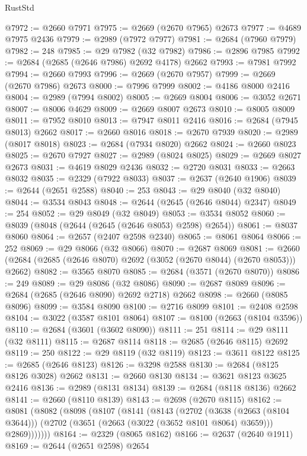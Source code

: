 \begin{lexlean}{RustStd}
\begin{coremodule}
@7972 := @2660 @7971
@7975 := @2669 (@2670 @7965) @2673
@7977 := @4689 @7975 @2436
@7979 := @2989 (@7972 @7977)
@7981 := @2684 (@7960 @7979)
@7982 := 248
@7985 := @29 @7982 (@32 @7982)
@7986 := @2896 @7985
@7992 := @2684 (@2685 (@2646 @7986) @2692 @4178) @2662
@7993 := @7981 @7992
@7994 := @2660 @7993
@7996 := @2669 (@2670 @7957)
@7999 := @2669 (@2670 @7986) @2673
@8000 := @7996 @7999
@8002 := @4186 @8000 @2416
@8004 := @2989 (@7994 @8002)
@8005 := @2669 @8004
@8006 := @3052 @2671
@8007 := @8006 @4629
@8009 := @2669 @8007 @2673
@8010 := @8005 @8009
@8011 := @7952 @8010
@8013 := @7947 @8011 @2416
@8016 := @2684 (@7945 @8013) @2662
@8017 := @2660 @8016
@8018 := @2670 @7939
@8020 := @2989 (@8017 @8018)
@8023 := @2684 (@7934 @8020) @2662
@8024 := @2660 @8023
@8025 := @2670 @7927
@8027 := @2989 (@8024 @8025)
@8029 := @2669 @8027 @2673
@8031 := @4619 @8029 @2436
@8032 := @2720 @8031
@8033 := @2663 @8032
@8035 := @2329 (@7922 @8033)
@8037 := @2637 (@2640 @1906)
@8039 := @2644 (@2651 @2588)
@8040 := 253
@8043 := @29 @8040 (@32 @8040)
@8044 := @3534 @8043
@8048 := @2644 (@2645 (@2646 @8044) @2347)
@8049 := 254
@8052 := @29 @8049 (@32 @8049)
@8053 := @3534 @8052
@8060 := @8039 (@8048 (@2644 (@2645 (@2646 @8053) @2598) @2654))
@8061 := @8037 @8060
@8064 := @2657 (@2407 @2598 @2340)
@8065 := @8061 @8064
@8066 := 252
@8069 := @29 @8066 (@32 @8066)
@8070 := @2687 @8069
@8081 := @2660 (@2684 (@2685 (@2646 @8070) @2692 (@3052 (@2670 @8044) (@2670 @8053))) @2662)
@8082 := @3565 @8070
@8085 := @2684 (@3571 (@2670 @8070))
@8086 := 249
@8089 := @29 @8086 (@32 @8086)
@8090 := @2687 @8089
@8096 := @2684 (@2685 (@2646 @8090) @2692 @2718) @2662
@8098 := @2660 (@8085 @8096)
@8099 := @3584 @8090
@8100 := @2716 @8099
@8101 := @2408 @2598
@8104 := @3022 (@3587 @8101 @8064)
@8107 := @8100 (@2663 (@8104 @3596))
@8110 := @2684 (@3601 (@3602 @8090))
@8111 := 251
@8114 := @29 @8111 (@32 @8111)
@8115 := @2687 @8114
@8118 := @2685 (@2646 @8115) @2692
@8119 := 250
@8122 := @29 @8119 (@32 @8119)
@8123 := @3611 @8122
@8125 := @2685 (@2646 @8123)
@8126 := @3298 @2588
@8130 := @2684 (@8125 @8126 @3028) @2662
@8131 := @2660 @8130
@8134 := @3621 @8123 @3625 @2416
@8136 := @2989 (@8131 @8134)
@8139 := @2684 (@8118 @8136) @2662
@8141 := @2660 (@8110 @8139)
@8143 := @2698 (@2670 @8115)
@8162 := @8081
    (@8082
      (@8098
        (@8107
          (@8141
            (@8143
              (@2702
                (@3638 (@2663 (@8104 @3644)))
                (@2702 (@3651 (@2663 (@3022 (@3652 @8101 @8064) @3659))) @2869)))))))
@8164 := @2329 (@8065 @8162)
@8166 := @2637 (@2640 @1911)
@8169 := @2644 (@2651 @2598) @2654

\end{coremodule}
\end{lexlean}

